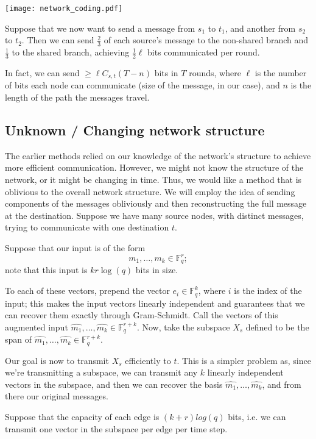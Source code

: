 \documentclass[11pt]{article}
\newcommand{\F}{\mathbb{F}}
\begin{document}
\begin{center}
\texttt{[image: network\_coding.pdf]}
\end{center}

Suppose that we now want to send a message from $s_1$ to $t_1$, and another from $s_2$ to $t_2$. Then
we can send $\frac{2}{3}$ of each source's message to the non-shared branch and $\frac{1}{3}$ to the
shared branch, achieving $\frac{1}{2}\ell$ bits communicated per round.

In fact, we can send $\geq \ell C_{s,t} (T - n)$ bits in $T$ rounds, where $\ell$ is the number of bits
each node can communicate (size of the message, in our case), and $n$ is the length of the path the
messages travel.

\subsection{Unknown / Changing network structure}

The earlier methods relied on our knowledge of the network's structure to achieve more efficient
communication. However, we might not know the structure of the network, or it might be changing in time.
Thus, we would like a method that is oblivious to the overall network structure. We will employ the idea
of sending components of the messages obliviously and then reconstructing the full message at the destination.
Suppose we have many source nodes, with distinct messages, trying to communicate with one destination $t$.

Suppose that our input is of the form
$$
m_1, \ldots, m_k \in \F_q^r;
$$
note that this input is $kr\log(q)$ bits in size.

To each of these vectors, prepend the vector $e_i \in \F_q^k$, where $i$ is the index of the input;
this makes the input vectors linearly independent and guarantees that we can recover them exactly through
Gram-Schmidt. Call the vectors of this augmented input $\hat{m_1}, \ldots, \hat{m_k} \in \F_q^{r+k}$.
Now, take the subspace $X_s$ defined to be the span of $\hat{m_1}, \ldots, \hat{m_k} \in \F_q^{r+k}$.

Our goal is now to transmit $X_s$ efficiently to $t$. This is a simpler problem as, since we're transmitting a subspace,
we can transmit any $k$ linearly independent vectors in the subspace, and then we can recover the basis
$\hat{m_1}, \ldots, \hat{m_k}$, and from there our original messages.

Suppose that the capacity of each edge is $(k+r)log(q)$ bits, i.e. we can transmit one vector in the
subspace per edge per time step.
\end{document}
